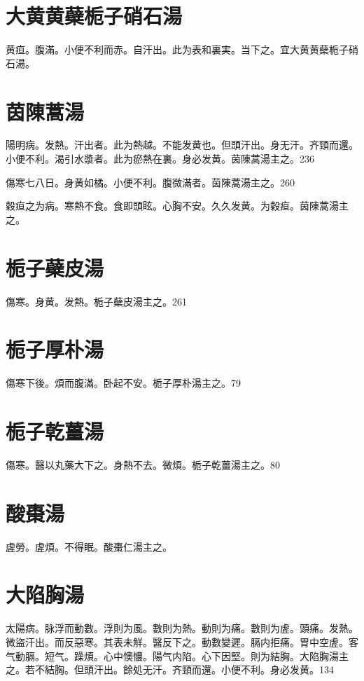 \documentclass[12pt,twoside,UTF8,b5paper]{ctexbook}
\begin{document}
\section{大黄黄蘗栀子硝石湯}

黄疸。腹滿。小便不利而赤。自汗出。此为表和裏実。当下之。宜大黄{黄蘗栀子}硝石湯。

\section{茵陳蒿湯}

陽明病。发熱。汗出者。此为熱越。不能发黄也。但頭汗出。身无汗。齐頸而還。小便不利。渴引水漿者。此为瘀熱在裏。身必发黄。茵陳{蒿}湯主之。236

傷寒七八日。身黄如橘。小便不利。腹微滿者。茵陳{蒿}湯主之。260

穀疸之为病。寒熱不食。食即頭眩。心胸不安。久久发黄。为穀疸。茵陳蒿湯主之。

\section{栀子蘗皮湯}

傷寒。身黄。发熱。栀子蘗皮湯主之。261

\section{栀子厚朴湯}

傷寒下後。煩而腹滿。卧起不安。栀子厚朴湯主之。79

\section{栀子乾薑湯}

傷寒。醫以丸藥大下之。身熱不去。微煩。栀子乾薑湯主之。80

\section{酸棗湯}

虗勞。虗煩。不得眠。酸棗{仁}湯主之。

\section{大陷胸湯}

太陽病。脉浮而動數。浮則为風。數則为熱。動則为痛。數則为虗。頭痛。发熱。微盜汗出。而反惡寒。其表未觧。醫反下之。動數變遲。膈内拒痛。胃中空虗。客气動膈。短气。躁煩。心中懊憹。陽气内陷。心下因堅。則为結胸。大陷胸湯主之。若不結胸。但頭汗出。餘処无汗。齐頸而還。小便不利。身必发黄。134
\end{document}

